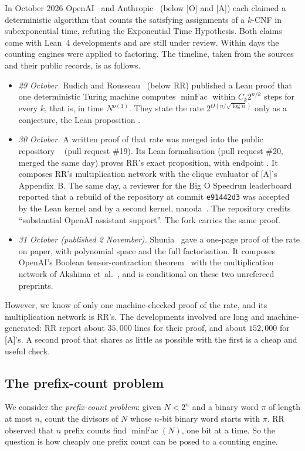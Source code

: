 \documentclass[10pt]{amsart}
\theoremstyle{plain}
\theoremstyle{definition}
\theoremstyle{remark}
\numberwithin{equation}{section}
\newcommand{\minFac}{\operatorname{minFac}}
\newcommand{\A}{\textup{[A]}}
\newcommand{\Oa}{\textup{[O]}}
\begin{document}
In October 2026 OpenAI~\cite{OpenAI26} and Anthropic~\cite{Anthropic26} (below \Oa{} and \A) each
claimed a deterministic algorithm that counts the satisfying assignments of a $k$-CNF in
subexponential time, refuting the Exponential Time Hypothesis. Both claims come with Lean~4
developments and are still under review. Within days the counting engines were applied to factoring.
The timeline, taken from the sources and their public records, is as follows.
\begin{itemize}
\item \emph{29 October.} Rudich and Rousseau~\cite{RR26} (below RR) published a Lean proof that one
deterministic Turing machine computes $\minFac$ within $C_k2^{n/k}$ steps for every $k$, that is, in
time $N^{o(1)}$. They state the rate $2^{O(n/\sqrt{\log n})}$ only as a conjecture, the Lean
proposition .
\item \emph{30 October.} A written proof of that rate was merged into the public repository
~\cite{IF26} (pull request \#19). Its Lean formalisation
(pull request \#20, merged the same day) proves RR's exact proposition, with endpoint
. It composes RR's multiplication network with
the clique evaluator of \A's Appendix~B. The same day, a reviewer for the Big O Speedrun leaderboard
reported that a rebuild of the repository at commit \texttt{e91442d3} was accepted by the Lean kernel and
by a second kernel, nanoda~\cite{BOS26}. The repository credits ``substantial OpenAI assistant
support''. The fork  carries the same proof.
\item \emph{31 October (published 2 November).} Shunia~\cite{Shu26} gave a one-page proof of the rate
on paper, with polynomial space and the full factorisation. It composes OpenAI's Boolean
tensor-contraction theorem~\cite[Thm.~D.1]{OpenAI26} with the multiplication network of Akshima
et~al.~\cite{AK26}, and is conditional on these two unrefereed preprints.
\end{itemize}
However, we know of only one machine-checked proof of the rate, and its multiplication network is RR's.
The developments involved are long and machine-generated: RR report about $35{,}000$ lines for their
proof, and about $152{,}000$ for \A's. A second proof that shares as little as possible with the first
is a cheap and useful check.

\subsection{The prefix-count problem}
We consider the \emph{prefix-count problem}: given $N<2^n$ and a binary word $\pi$ of length at most $n$,
count the divisors of $N$ whose $n$-bit binary word starts with $\pi$. RR observed that $n$ prefix counts
find $\minFac(N)$, one bit at a time. So the question is how cheaply one prefix count can be posed to a
counting engine.
\end{document}
